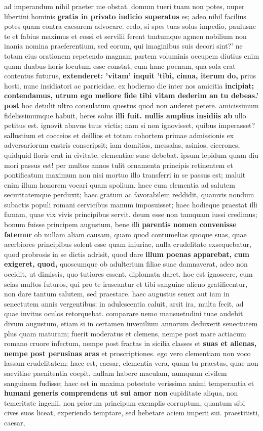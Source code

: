 ad imperandum nihil praeter me obstat. domum tueri tuam non potes, nuper libertini hominis \textbf{gratia in privato iudicio superatus} es; adeo nihil facilius potes quam contra caesarem advocare. cedo, si spes tuas solus impedio, paulusne te et fabius maximus et cossi et servilii ferent tantumque agmen nobilium non inania nomina praeferentium, sed eorum, qui imaginibus suis decori sint?' ne totam eius orationem repetendo magnam partem voluminis occupem diutius enim quam duabus horis locutum esse constat, cum hanc poenam, qua sola erat contentus futurus, \textbf{extenderet: 'vitam' inquit 'tibi, cinna, iterum do,} prius hosti, nunc insidiatori ac parricidae. ex hodierno die inter nos amicitia \textbf{incipiat; \textbf{contendamus, utrum ego meliore} \textbf{fide tibi} vitam dederim an tu debeas.' post} hoc detulit ultro consulatum questus quod non auderet petere. amicissimum fidelissimumque habuit, heres solus \textbf{illi fuit. nullis amplius insidiis ab} ullo petitus est. ignovit abavus tuus victis; nam si non ignovisset, quibus imperasset? sallustium et cocceios et deillios et totam cohortem primae admissionis ex adversariorum castris conscripsit; iam domitios, messalas, asinios, cicerones, quidquid floris erat in civitate, clementiae suae debebat. ipsum lepidum quam diu mori passus est! per multos annos tulit ornamenta principis retinentem et pontificatum maximum non nisi mortuo illo transferri in se passus est; maluit enim illum honorem vocari quam spolium. haec eum clementia ad salutem securitatemque perduxit; haec gratum ac favorabilem reddidit, quamvis nondum subactis populi romani cervicibus manum imposuisset; haec hodieque praestat illi famam, quae vix vivis principibus servit. deum esse non tamquam iussi credimus; bonum fuisse principem augustum, bene illi \textbf{parentis nomen convenisse fatemur} ob nullam aliam causam, quam quod contumelias quoque suas, quae acerbiores principibus solent esse quam iniuriae, nulla crudelitate exsequebatur, quod probrosis in se dictis adrisit, quod dare \textbf{illum poenas apparebat, cum exigeret, quod,} quoscumque ob adulterium filiae suae damnaverat, adeo non occidit, ut dimissis, quo tutiores essent, diplomata daret. hoc est ignoscere, cum scias multos futuros, qui pro te irascantur et tibi sanguine alieno gratificentur, non dare tantum salutem, sed praestare. haec augustus senex aut iam in senectutem annis vergentibus; in adulescentia caluit, arsit ira, multa fecit, ad quae invitus oculos retorquebat. comparare nemo mansuetudini tuae audebit divum augustum, etiam si in certamen iuvenilium annorum deduxerit senectutem plus quam maturam; fuerit moderatus et clemens, nempe post mare actiacum romano cruore infectum, nempe post fractas in sicilia classes et \textbf{suas \textbf{et alienas, nempe post perusinas} aras} et proscriptiones. ego vero clementiam non voco lassam crudelitatem; haec est, caesar, clementia vera, quam tu praestas, quae non saevitiae paenitentia coepit, nullam habere maculam, numquam civilem sanguinem fudisse; haec est in maxima potestate verissima animi temperantia et \textbf{humani generis comprendens ut sui amor non} cupiditate aliqua, non temeritate ingenii, non priorum principum exemplis corruptum, quantum sibi cives suos liceat, experiendo temptare, sed hebetare aciem imperii sui. praestitisti, caesar, 